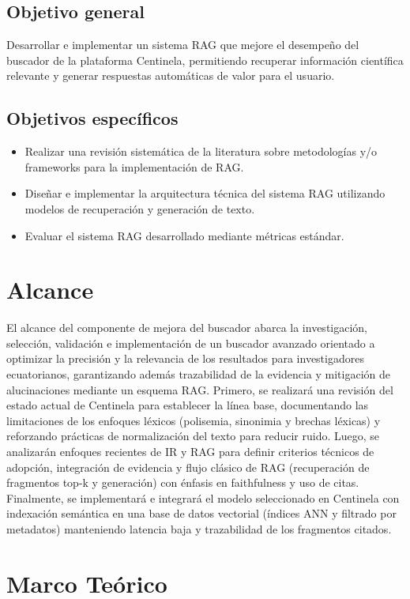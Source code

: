 \subsection{Objetivo general}
Desarrollar e implementar un sistema RAG que mejore el desempeño del buscador de la plataforma
Centinela, permitiendo recuperar información científica relevante y generar respuestas automáticas
de valor para el usuario.
\subsection{Objetivos específicos}
\begin{itemize}[align=left, label=-]
    \item Realizar una revisión sistemática de la literatura sobre metodologías y/o frameworks para la implementación de RAG.
    \item Diseñar e implementar la arquitectura técnica del sistema RAG utilizando modelos de recuperación y generación de texto.
    \item Evaluar el sistema RAG desarrollado mediante métricas estándar.
\end{itemize}

\section{Alcance}
El alcance del componente de mejora del buscador abarca la investigación, selección, validación e implementación de un buscador avanzado orientado a
 optimizar la precisión y la relevancia de los resultados para investigadores ecuatorianos, garantizando además trazabilidad de la evidencia y mitigación
  de alucinaciones mediante un esquema RAG. Primero, se realizará una revisión del estado actual de Centinela para establecer la línea base, documentando 
  las limitaciones de los enfoques léxicos (polisemia, sinonimia y brechas léxicas) y reforzando prácticas de normalización del texto para reducir ruido.
Luego, se analizarán enfoques recientes de IR y RAG para definir criterios técnicos de adopción, integración de evidencia 
y flujo clásico de RAG (recuperación de fragmentos top-k y generación) con énfasis en faithfulness y uso de citas.
Finalmente, se implementará e integrará el modelo seleccionado en Centinela con indexación semántica en una base de datos vectorial (índices ANN y 
filtrado por metadatos) manteniendo latencia baja y trazabilidad de los fragmentos citados.

\section{Marco Teórico}

